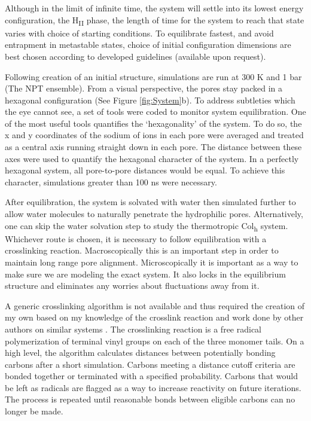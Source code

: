 \documentclass[12pt]{article}
\begin{document}
Although in the limit of infinite time, the system will settle into its lowest energy configuration, the H\textsubscript{II} phase, the length of time for the system to reach that state varies with choice of starting conditions. To equilibrate fastest, and avoid entrapment in metastable states, choice of initial configuration dimensions are best chosen according to developed guidelines (available upon request).

Following creation of an initial structure, simulations are run at 300 K and 1 bar (The NPT ensemble). From a visual perspective, the pores stay packed in a hexagonal configuration (See Figure \ref{fig:System}b). To address subtleties which the eye cannot see, a set of tools were coded to monitor system equilibration. One of the most useful tools quantifies the ‘hexagonality’ of the system. To do so, the x and y coordinates of the sodium of ions in each pore were averaged and treated as a central axis running straight down in each pore. The distance between these axes were used to quantify the hexagonal character of the system. In a perfectly hexagonal system, all pore-to-pore distances would be equal. To achieve this character, simulations greater than 100 ns were necessary.

After equilibration, the system is solvated with water then simulated further to allow water molecules to naturally penetrate the hydrophilic pores. Alternatively, one can skip the water solvation step to study the thermotropic Col\textsubscript{h} system. Whichever route is chosen, it is necessary to follow equilibration with a crosslinking reaction. Macroscopically this is an important step in order to maintain long range pore alignment. Microscopically it is important as a way to make sure we are modeling the exact system. It also locks in the equilibrium structure and eliminates any worries about fluctuations away from it.
 
A generic crosslinking algorithm is not available and thus required the creation of my own based on my knowledge of the crosslink reaction and work done by other authors on similar systems \cite{jang_relative_2012}. The crosslinking reaction is a free radical polymerization of terminal vinyl groups on each of the three monomer tails. On a high level, the algorithm calculates distances between potentially bonding carbons after a short simulation. Carbons meeting a distance cutoff criteria are bonded together or terminated with a specified probability. Carbons that would be left as radicals are flagged as a way to increase reactivity on future iterations. The process is repeated until reasonable bonds between eligible carbons can no longer be made. 
\end{document}
